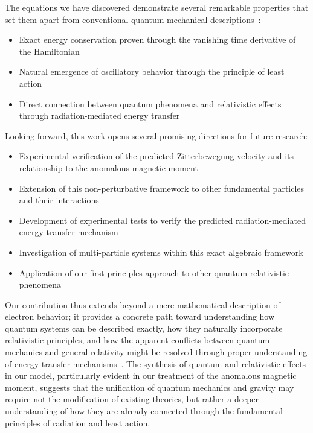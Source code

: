 \documentclass[%
 reprint,
 amsmath,amssymb,
 aps,
]{revtex4-1}
\numberwithin{equation}{section}%
\begin{document}
The equations we have discovered demonstrate several remarkable properties that set them apart from conventional quantum mechanical descriptions~\cite{shapere1989}:
\begin{itemize}
\item Exact energy conservation proven through the vanishing time derivative of the Hamiltonian
\item Natural emergence of oscillatory behavior through the principle of least action
\item Direct connection between quantum phenomena and relativistic effects through radiation-mediated energy transfer
\end{itemize}

Looking forward, this work opens several promising directions for future research:
\begin{itemize}
\item Experimental verification of the predicted Zitterbewegung velocity and its relationship to the anomalous magnetic moment
\item Extension of this non-perturbative framework to other fundamental particles and their interactions
\item Development of experimental tests to verify the predicted radiation-mediated energy transfer mechanism
\item Investigation of multi-particle systems within this exact algebraic framework
\item Application of our first-principles approach to other quantum-relativistic phenomena
\end{itemize}

Our contribution thus extends beyond a mere mathematical description of electron behavior; it provides a concrete path toward understanding how quantum systems can be described exactly, how they naturally incorporate relativistic principles, and how the apparent conflicts between quantum mechanics and general relativity might be resolved through proper understanding of energy transfer mechanisms~\cite{misner1973}. The synthesis of quantum and relativistic effects in our model, particularly evident in our treatment of the anomalous magnetic moment, suggests that the unification of quantum mechanics and gravity may require not the modification of existing theories, but rather a deeper understanding of how they are already connected through the fundamental principles of radiation and least action.


\end{document}
